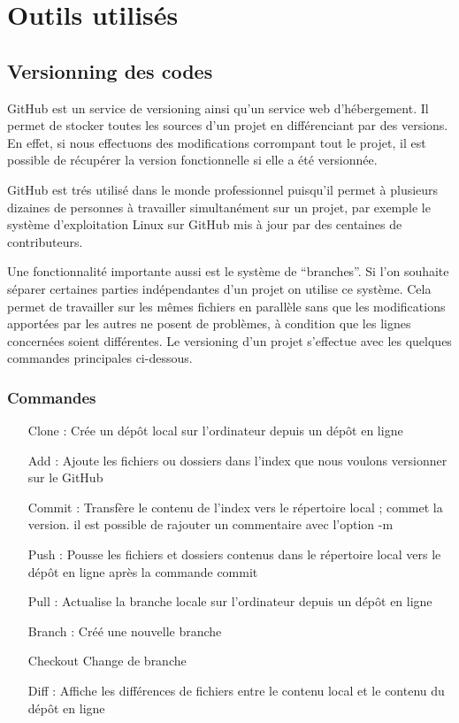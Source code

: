 \clearpage

\section{Outils utilisés}

\subsection{Versionning des codes}

GitHub est un service de versioning ainsi qu’un service web d’hébergement. Il permet de
stocker toutes les sources d’un projet en différenciant par des versions. En effet, si nous
effectuons des modifications corrompant tout le projet, il est possible de récupérer la
version fonctionnelle si elle a été versionnée. \medskip

GitHub est trés utilisé dans le monde professionnel puisqu’il permet à plusieurs dizaines
de personnes à travailler simultanément sur un projet, par exemple le système
d’exploitation Linux sur GitHub mis à jour par des centaines de contributeurs. \medskip

Une fonctionnalité importante aussi est le système de “branches”. Si l’on souhaite séparer
certaines parties indépendantes d’un projet on utilise ce système. Cela permet de travailler
sur les mêmes fichiers en parallèle sans que les modifications apportées par les autres ne
posent de problèmes, à condition que les lignes concernées soient différentes. Le
versioning d’un projet s’effectue avec les quelques commandes principales ci-dessous.

\subsubsection{Commandes}

\begin{itemize}
    \item[Clone : ] Crée un dépôt local sur l’ordinateur depuis un dépôt en ligne
    \item[Add : ] Ajoute les fichiers ou dossiers dans l’index que nous voulons versionner sur le
    GitHub
    \item[Commit : ] Transfère le contenu de l’index vers le répertoire local ; commet la version. il est
    possible de rajouter un commentaire avec l’option -m
    \item[Push : ] Pousse les fichiers et dossiers contenus dans le répertoire local vers le dépôt en
    ligne après la commande commit
    \item[Pull : ] Actualise la branche locale sur l’ordinateur depuis un dépôt en ligne
    \item[Branch : ] Créé une nouvelle branche
    \item[Checkout ] Change de branche
    \item[Diff : ] Affiche les différences de fichiers entre le contenu local et le contenu du dépôt en
    ligne
\end{itemize}

